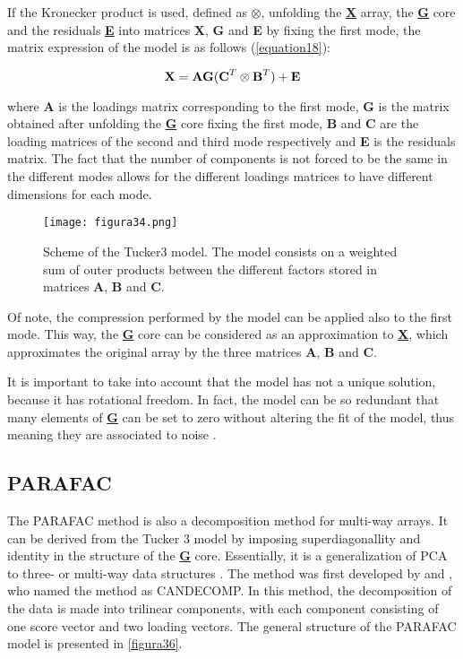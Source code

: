 If the Kronecker product is used, defined as $\otimes$, unfolding the \textbf{\underline{X}} array, the \textbf{\underline{G}} core and the residuals \textbf{\underline{E}} into matrices \textbf{X}, \textbf{G} and \textbf{E} by fixing the first mode, the matrix expression of the model is as follows (\autoref{equation18}):

\begin{equation}
\textbf{\text{X}}=\textbf{\text{AG}}(\textbf{\text{C}}^T\otimes \textbf{\text{B}}^T)+\textbf{\text{E}}
\label{equation18}
\end{equation}

where \textbf{A} is the loadings matrix corresponding to the first mode, \textbf{G} is the matrix obtained after unfolding the \textbf{\underline{G}} core fixing the first mode, \textbf{B} and \textbf{C} are the loading matrices of the second and third mode respectively and \textbf{E} is the residuals matrix. The fact that the number of components is not forced to be the same in the different modes allows for the different loadings matrices to have different dimensions for each mode.

\begin{figure}[hbtp]
\centering
\texttt{[image: figura34.png]}
\caption[Scheme of the Tucker3 model]{Scheme of the Tucker3 model. The model consists on a weighted sum of outer products between the different factors stored in matrices \textbf{A}, \textbf{B} and \textbf{C}.}
\label{figura34}
\end{figure}

Of note, the compression performed by the model can be applied also to the first mode. This way, the \textbf{\underline{G}} core can be considered as an approximation to \textbf{\underline{X}}, which approximates the original array by the three matrices \textbf{A}, \textbf{B} and \textbf{C}.

It is important to take into account that the model has not a unique solution, because it has rotational freedom. In fact, the model can be so redundant that many elements of \textbf{\underline{G}} can be set to zero without altering the fit of the model, thus meaning they are associated to noise \parencite{montalban2005control}.

\subsection{PARAFAC}
The PARAFAC method is also a decomposition method for multi-way arrays. It can be derived from the Tucker 3 model by imposing superdiagonallity and identity in the structure of the \textbf{\underline{G}} core. Essentially, it is a generalization of PCA to three- or multi-way data structures \parencite{bro1997parafac}. The method was first developed by \textcite{harshman1970foundations} and \textcite{carroll1970analysis}, who named the method as CANDECOMP. In this method, the decomposition of the data is made into trilinear components, with each component consisting of one score vector and two loading vectors. The general structure of the PARAFAC model is presented in \autoref{figura36}.


